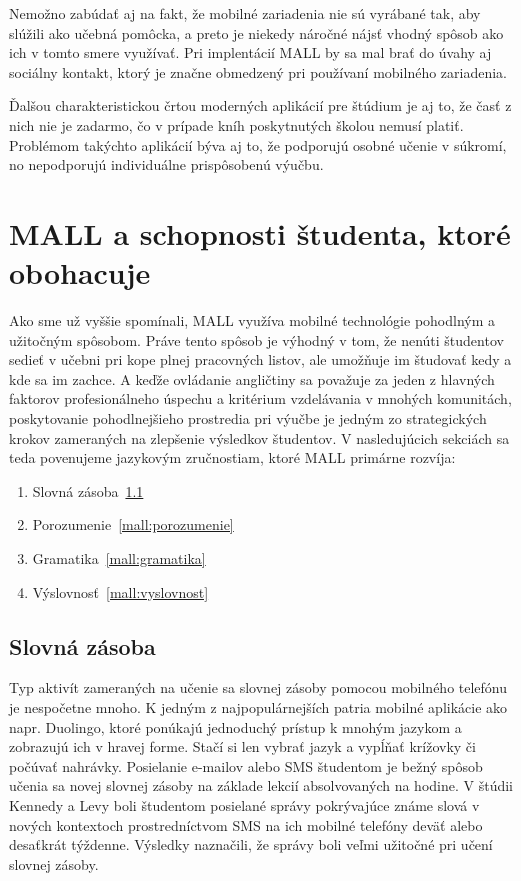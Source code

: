 \documentclass[10pt,oneside,slovak,a4paper]{article}
\begin{document}
Nemožno zabúdať aj na fakt, že mobilné zariadenia nie sú vyrábané tak, aby slúžili ako učebná pomôcka, a preto je niekedy náročné nájsť vhodný spôsob ako ich v tomto smere využívať. Pri implentácií MALL by sa mal brať do úvahy aj sociálny kontakt, ktorý je značne obmedzený pri používaní mobilného zariadenia.

Ďalšou charakteristickou črtou moderných aplikácií pre štúdium je aj to, že časť z nich nie je zadarmo, čo v prípade kníh poskytnutých školou nemusí platiť. Problémom takýchto aplikácií býva aj to, že podporujú osobné učenie v súkromí, no nepodporujú individuálne prispôsobenú výučbu.





\section{MALL a schopnosti študenta, ktoré obohacuje} \label{mall}

Ako sme už vyššie spomínali, MALL využíva mobilné technológie pohodlným a užitočným spôsobom. Práve tento spôsob je výhodný v tom, že nenúti študentov sedieť v učebni pri kope plnej pracovných listov, ale umožňuje im študovať kedy a kde sa im zachce. A keďže ovládanie angličtiny sa považuje za jeden z hlavných faktorov profesionálneho úspechu a kritérium vzdelávania v mnohých komunitách, poskytovanie pohodlnejšieho prostredia pri výučbe je jedným zo strategických krokov zameraných na zlepšenie výsledkov študentov\cite{Miangah2012}. V nasledujúcich sekciách sa teda povenujeme jazykovým zručnostiam, ktoré MALL primárne rozvíja:

\begin{enumerate}
\item Slovná zásoba~\ref{mall:slovnazasoba}
\item Porozumenie~\ref{mall:porozumenie}
\item Gramatika~\ref{mall:gramatika}
\item Výslovnosť~\ref{mall:vyslovnost}
\end{enumerate}


\subsection{Slovná zásoba} \label{mall:slovnazasoba}

Typ aktivít zameraných na učenie sa slovnej zásoby pomocou mobilného telefónu je nespočetne mnoho. K jedným z najpopulárnejších patria mobilné aplikácie ako napr. Duolingo, ktoré ponúkajú jednoduchý prístup k mnohým jazykom a zobrazujú ich v hravej forme. Stačí si len vybrať jazyk a vypĺňať krížovky či počúvať nahrávky. Posielanie e-mailov alebo SMS študentom je bežný spôsob učenia sa novej slovnej zásoby na základe lekcií absolvovaných na hodine. V štúdii Kennedy a Levy boli študentom posielané správy pokrývajúce známe slová v nových kontextoch prostredníctvom SMS na ich mobilné telefóny deväť alebo desaťkrát týždenne. Výsledky naznačili, že správy boli veľmi užitočné pri učení slovnej zásoby\cite{Kennedy2008}. 
\end{document}
